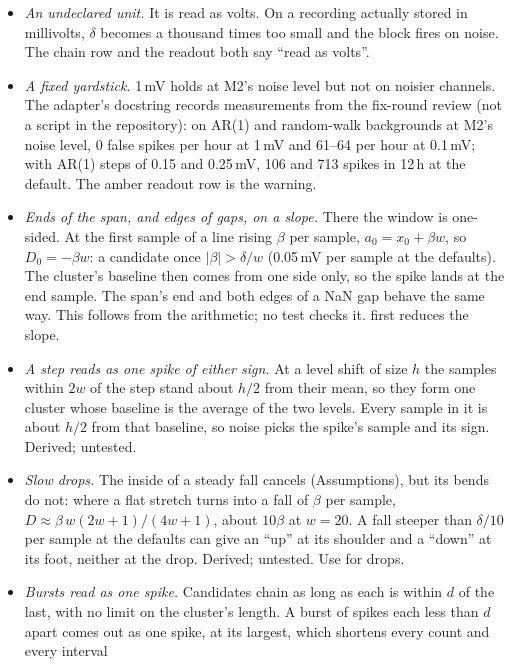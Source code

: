 \begin{itemize}
\item \emph{An undeclared unit.} It is read as volts. On a recording actually stored in
  millivolts, $\delta$ becomes a thousand times too small and the block fires on noise. The
  chain row and the readout both say ``read as volts''.
\item \emph{A fixed yardstick.} 1\,mV holds at M2's noise level but not on noisier channels.
  The adapter's docstring records measurements from the fix-round review (not a script in
  the repository): on AR(1) and random-walk backgrounds at M2's noise level, 0 false spikes
  per hour at 1\,mV and 61--64 per hour at 0.1\,mV; with AR(1) steps of 0.15 and 0.25\,mV,
  106 and 713 spikes in 12\,h at the default. The amber readout row is the warning.
\item \emph{Ends of the span, and edges of gaps, on a slope.} There the window is
  one-sided. At the first sample of a line rising $\beta$ per sample, $a_0 = x_0 + \beta w$,
  so $D_0 = -\beta w$: a candidate once $|\beta| > \delta / w$ (0.05\,mV per sample at the
  defaults). The cluster's baseline then comes from one side only, so the spike lands at the
  end sample. The span's end and both edges of a NaN gap behave the same way. This follows
  from the arithmetic; no test checks it.  first reduces
  the slope.
\item \emph{A step reads as one spike of either sign.} At a level shift of size $h$ the
  samples within $2w$ of the step stand about $h/2$ from their mean, so they form one cluster
  whose baseline is the average of the two levels. Every sample in it is about $h/2$ from
  that baseline, so noise picks the spike's sample and its sign. Derived; untested.
\item \emph{Slow drops.} The inside of a steady fall cancels (Assumptions), but its bends do
  not: where a flat stretch turns into a fall of $\beta$ per sample,
  $D \approx \beta\, w(2w+1)/(4w+1)$, about $10\beta$ at $w = 20$. A fall steeper than
  $\delta/10$ per sample at the defaults can give an ``up'' at its shoulder and a ``down'' at
  its foot, neither at the drop. Derived; untested. Use 
  for drops.
\item \emph{Bursts read as one spike.} Candidates chain as long as each is within $d$ of the
  last, with no limit on the cluster's length. A burst of spikes each less than $d$ apart
  comes out as one spike, at its largest, which shortens every count and every interval

\end{itemize}
